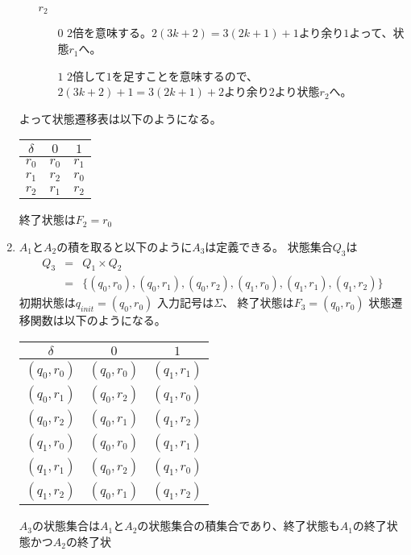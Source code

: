 \documentclass[dvipdfmx,titlepage, 11pt, a4paper]{jsarticle}%
\begin{document}
\begin{enumerate}[(1)]
\begin{itemize}
    \item [$r_2$] 
    \begin{itemize}
      \item[$0$] 
      $2$倍を意味する。$2(3k + 2) = 3(2k + 1) + 1$より余り$1$よって、状態$r_1$へ。
      \item[$1$] 
      $2$倍して$1$を足すことを意味するので、$2(3k + 2) + 1 = 3(2k + 1) + 2$より余り$2$より状態$r_2$へ。
    \end{itemize}
  \end{itemize}
  よって状態遷移表は以下のようになる。
  \begin{table}[htbp]
    \centering
    \begin{tabular}{c|cc}
      \hline
      $\delta$ & $0$ & $1$\\
      \hline
      $r_0$ & $r_0$ & $r_1$\\
      $r_1$ & $r_2$ & $r_0$\\
      $r_2$ & $r_1$ & $r_2$\\
      \hline
    \end{tabular}
  \end{table}
  終了状態は$F_2 = {r_0}$
  \item $A_1$と$A_2$の積を取ると以下のように$A_3$は定義できる。
  状態集合$Q_3$は
  \begin{eqnarray*}
    Q_3 &=& Q_1 \times Q_2\\
    &=& \{(q_0, r_0), (q_0, r_1), (q_0, r_2), (q_1, r_0), (q_1, r_1), (q_1, r_2)\}
  \end{eqnarray*}
  初期状態は$q_{init} = (q_0, r_0)$
  入力記号は$\Sigma$、 終了状態は$F_3 = (q_0, r_0)$
  状態遷移関数は以下のようになる。
  \begin{table}[htbp]
    \centering
    \begin{tabular}{c|cc}
      \hline
      $\delta$ & $0$ & $1$\\
      \hline
      $(q_0, r_0)$ & $(q_0, r_0)$ & $(q_1, r_1)$\\
      $(q_0, r_1)$ & $(q_0, r_2)$ & $(q_1, r_0)$\\
      $(q_0, r_2)$ & $(q_0, r_1)$ & $(q_1, r_2)$\\
      $(q_1, r_0)$ & $(q_0, r_0)$ & $(q_1, r_1)$\\
      $(q_1, r_1)$ & $(q_0, r_2)$ & $(q_1, r_0)$\\
      $(q_1, r_2)$ & $(q_0, r_1)$ & $(q_1, r_2)$\\
      \hline
    \end{tabular}
  \end{table}
  $A_3$の状態集合は$A_1$と$A_2$の状態集合の積集合であり、終了状態も$A_1$の終了状態かつ$A_2$の終了状

\end{enumerate}
\end{document}
